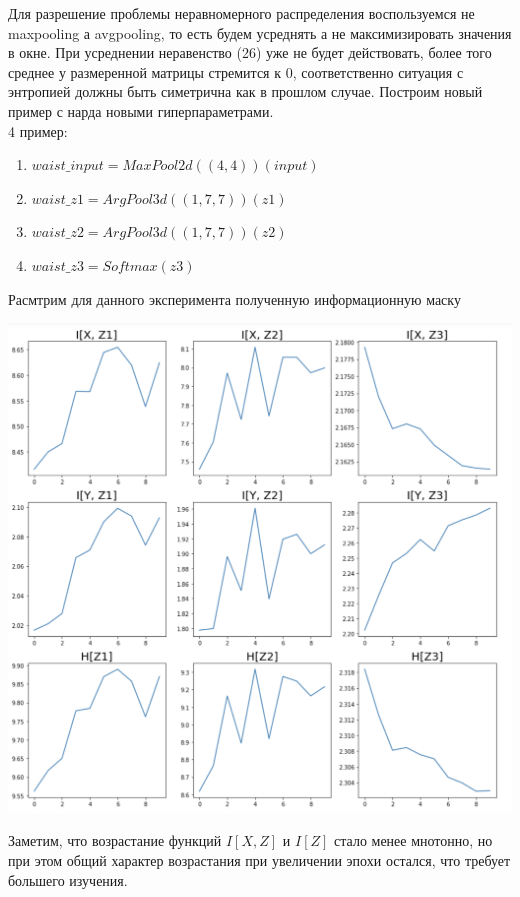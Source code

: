 Для разрешение проблемы неравномерного распределения воспользуемся не maxpooling а avgpooling, то есть будем усреднять а не максимизировать значения в окне. При усреднении неравенство (26) уже не будет действовать, более того среднее у размеренной матрицы стремится к 0, соответственно ситуация с энтропией должны быть симетрична как в прошлом случае. Построим новый пример с нарда новыми гиперпараметрами. \\
4 пример:
\begin{enumerate}
\item $waist\_input = MaxPool2d((4, 4))(input)$
\item $waist\_z1 = ArgPool3d((1, 7, 7))(z1)$
\item $waist\_z2 = ArgPool3d((1, 7, 7))(z2)$
\item $waist\_z3 = Softmax(z3)$
\end{enumerate}
Расмтрим для данного эксперимента полученную информационную маску
\begin{center}
    \includegraphics[scale=0.45]{images/v5.png}
\end{center}
Заметим, что возрастание функций $I[X, Z]$ и $I[Z]$ стало менее мнотонно, но при этом общий характер возрастания при увеличении эпохи остался, что требует большего изучения.
